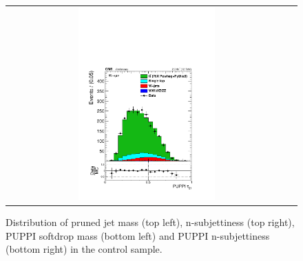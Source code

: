 \begin{figure}[ht!]
\begin{tabular}{cc}
\includegraphics[width=0.5\textwidth]{figures/vtagging/AN-16-215/Whadr_puppi_tau2tau1_mu.pdf}\\
\end{tabular}
\caption{Distribution of pruned jet mass (top left), n-subjettiness (top right), PUPPI softdrop mass (bottom left) and PUPPI n-subjettiness (bottom right) in the \ttbar control sample.} 
\label{fig:searchII:ttbarcp}
\end{figure}

